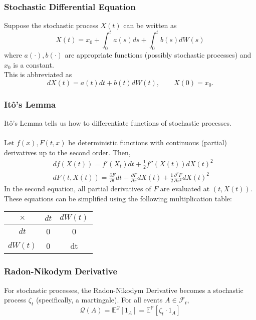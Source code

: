 \documentclass[11pt]{article}
\newcommand{\E}{\mathbb{E}}
\newcommand{\PR}{\mathbb{P}}
\newcommand{\Q}{\mathcal{Q}}
\begin{document}
	\subsubsection{Stochastic Differential Equation}
	Suppose the stochastic process \( X(t) \) can be written as
	\[	X(t) = x_0 + \int_{0}^{t} a(s) ds + \int_{0}^{t} b(s) dW(s)\]
	where \( a(\cdot), b(\cdot) \) are appropriate functions (possibly stochastic processes) and \( x_0 \) is a constant.\\
	This is abbreviated as
	\[	dX(t) = a(t) dt + b(t) dW(t), \qquad X(0) = x_0.\]
	\subsubsection{It\^{o}'s Lemma}
	It\^{o}'s Lemma tells us how to differentiate functions of stochastic processes.
	\\\\Let \( f(x), F(t, x) \) be deterministic functions with continuous (partial) derivatives up to the second order. Then, 
	\begin{align*}
		& df(X(t)) = f'(X_t) dt + \frac{1}{2}f''(X(t)) dX(t)^2 \\
		& dF(t, X(t)) = \frac{\partial F}{\partial t}dt + \frac{\partial F}{\partial x} dX(t) + \frac{1}{2}\frac{\partial^2 F}{\partial x^2} dX(t)^2
	\end{align*}
	In the second equation, all partial derivatives of \( F \) are evaluated at \( (t, X(t)) \).\\
	These equations can be simplified using the following multiplication table:
	\begin{center}
		\begin{tabular}{ccc}
			\( \times \) & \( dt \) & \( dW(t) \)\\
			\hline
			\hline
			\( dt \) & 0 & 0 \\
			\hline
			\( dW(t) \) & 0 & dt \\
			\hline
			\end{tabular}
		\end{center}
	\subsubsection{Radon-Nikodym Derivative}
	For stochastic processes, the Radon-Nikodym Derivative becomes a stochastic process \( \zeta_t \) (specifically, a martingale). For all events \( A\in\mathcal{F}_t \),
	\[	\Q(A) = \E^{\Q}[1_{A}] = \E^{\PR}[\zeta_t \cdot1_{A}]\]
\end{document}
